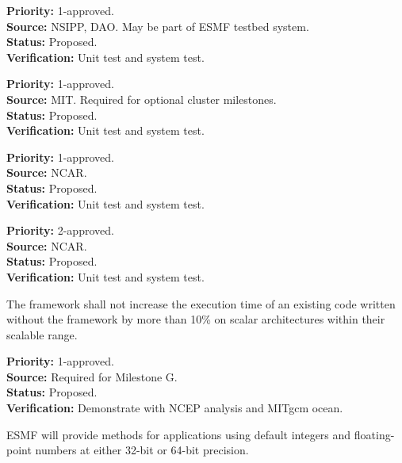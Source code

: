 \begin{reqlist}
{\bf Priority:} 1-approved. \\
{\bf Source:} NSIPP, DAO.  May be part of ESMF testbed system. \\
{\bf Status:} Proposed. \\
{\bf Verification:} Unit test and system test.
\end{reqlist}

\begin{reqlist}
{\bf Priority:} 1-approved. \\
{\bf Source:} MIT.  Required for optional cluster milestones. \\
{\bf Status:} Proposed. \\
{\bf Verification:} Unit test and system test.
\end{reqlist}

\begin{reqlist}
{\bf Priority:} 1-approved. \\
{\bf Source:} NCAR. \\
{\bf Status:} Proposed. \\
{\bf Verification:} Unit test and system test.
\end{reqlist}

\begin{reqlist}
{\bf Priority:} 2-approved. \\
{\bf Source:} NCAR. \\
{\bf Status:} Proposed. \\
{\bf Verification:} Unit test and system test.
\end{reqlist}

 \label{perf}
The framework shall not increase the execution time of an existing code 
written without the framework by more than 10\% on scalar 
architectures within their scalable range.
\begin{reqlist}
{\bf Priority:} 1-approved. \\
{\bf Source:} Required for Milestone G. \\
{\bf Status:} Proposed. \\
{\bf Verification:} Demonstrate with NCEP analysis and MITgcm ocean.
\end{reqlist}

 ESMF will provide methods for applications using
default integers and floating-point numbers at either 32-bit or 64-bit
precision.


